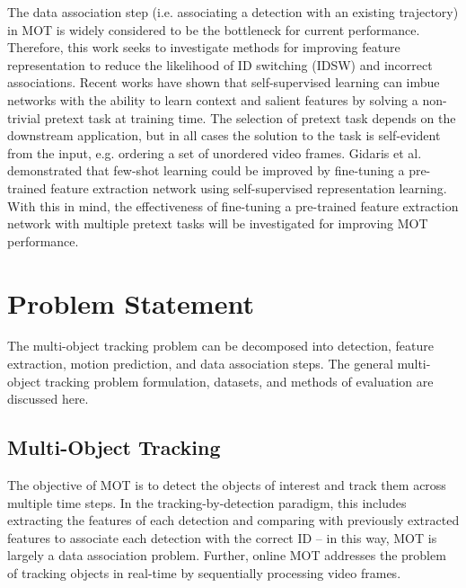 \documentclass[10pt,twocolumn,letterpaper]{article}
\begin{document}
The data association step (i.e. associating a detection with an existing trajectory) in MOT is widely considered to be the bottleneck for current performance. Therefore, this work seeks to investigate methods for improving feature representation to reduce the likelihood of ID switching (IDSW) and incorrect associations. Recent works have shown that self-supervised learning \cite{Jing2021} can imbue networks with the ability to learn context and salient features by solving a non-trivial pretext task at training time. The selection of pretext task depends on the downstream application, but in all cases the solution to the task is self-evident from the input, e.g. ordering a set of unordered video frames. Gidaris et al. \cite{Gidaris2019} demonstrated that few-shot learning could be improved by fine-tuning a pre-trained feature extraction network using self-supervised representation learning. With this in mind, the effectiveness of fine-tuning a pre-trained feature extraction network with multiple pretext tasks will be investigated for improving MOT performance.

\section{Problem Statement}
The multi-object tracking problem can be decomposed into detection, feature extraction, motion prediction, and data association steps. The general multi-object tracking problem formulation, datasets, and methods of evaluation are discussed here.
\subsection{Multi-Object Tracking}
The objective of MOT is to detect the objects of interest and track them across multiple time steps. In the tracking-by-detection paradigm, this includes extracting the features of each detection and comparing with previously extracted features to associate each detection with the correct ID -- in this way, MOT is largely a data association problem. Further, online MOT addresses the problem of tracking objects in real-time by sequentially processing video frames.
\end{document}

